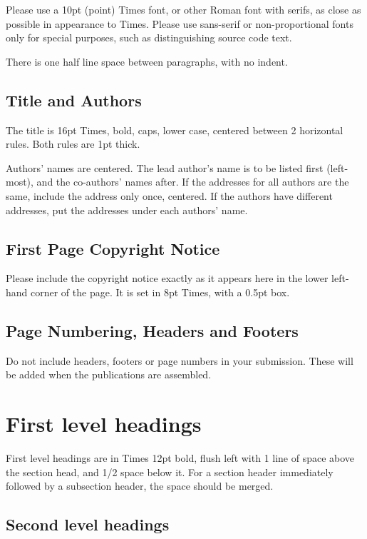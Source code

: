 \documentclass{article} \usepackage{proceed}
\begin{document}
Please use a 10pt (point) Times font, or other Roman font with serifs, as
close as possible in appearance to Times.  Please use sans-serif or
non-proportional fonts only for special purposes, such as
distinguishing source code text.

There is one half line space between paragraphs, with no indent.

\subsection{Title and Authors}

The title is 16pt Times, bold, caps, lower case, centered between 2
horizontal rules.  Both rules are 1pt thick.

Authors' names are centered.  The lead author's name is to be listed
first (left-most), and the co-authors' names after.  If the addresses
for all authors are the same, include the address only once, centered.
If the authors have different addresses, put the addresses under each
authors' name.

\subsection{First Page Copyright Notice}

Please include the copyright notice exactly as it appears here in the
lower left-hand corner of the page.  It is set in 8pt Times, with
a 0.5pt box.

\subsection{Page Numbering, Headers and Footers}

Do not include headers, footers or page numbers in your
submission. These will be added when the publications are assembled.

\section{First level headings}

First level headings are in Times 12pt bold, flush left with 1
line of space above the section head, and 1/2 space below it.  For a
section header immediately followed by a subsection header, the space
should be merged.

\subsection{Second level headings}
\end{document}
